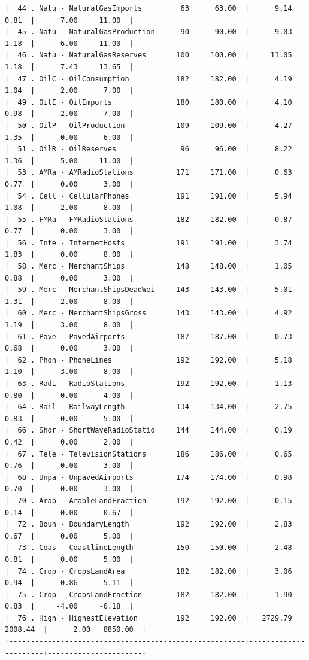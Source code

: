 \documentclass[a4paper,10pt,twocolumn]{article}
\begin{document}
\begin{landscape}
\begin{verbatim}
|  44 . Natu - NaturalGasImports         63      63.00  |      9.14      0.81  |      7.00     11.00  |
|  45 . Natu - NaturalGasProduction      90      90.00  |      9.03      1.18  |      6.00     11.00  |
|  46 . Natu - NaturalGasReserves       100     100.00  |     11.05      1.18  |      7.43     13.65  |
|  47 . OilC - OilConsumption           182     182.00  |      4.19      1.04  |      2.00      7.00  |
|  49 . OilI - OilImports               180     180.00  |      4.10      0.98  |      2.00      7.00  |
|  50 . OilP - OilProduction            109     109.00  |      4.27      1.35  |      0.00      6.00  |
|  51 . OilR - OilReserves               96      96.00  |      8.22      1.36  |      5.00     11.00  |
|  53 . AMRa - AMRadioStations          171     171.00  |      0.63      0.77  |      0.00      3.00  |
|  54 . Cell - CellularPhones           191     191.00  |      5.94      1.08  |      2.00      8.00  |
|  55 . FMRa - FMRadioStations          182     182.00  |      0.87      0.77  |      0.00      3.00  |
|  56 . Inte - InternetHosts            191     191.00  |      3.74      1.83  |      0.00      8.00  |
|  58 . Merc - MerchantShips            148     148.00  |      1.05      0.88  |      0.00      3.00  |
|  59 . Merc - MerchantShipsDeadWei     143     143.00  |      5.01      1.31  |      2.00      8.00  |
|  60 . Merc - MerchantShipsGross       143     143.00  |      4.92      1.19  |      3.00      8.00  |
|  61 . Pave - PavedAirports            187     187.00  |      0.73      0.68  |      0.00      3.00  |
|  62 . Phon - PhoneLines               192     192.00  |      5.18      1.10  |      3.00      8.00  |
|  63 . Radi - RadioStations            192     192.00  |      1.13      0.80  |      0.00      4.00  |
|  64 . Rail - RailwayLength            134     134.00  |      2.75      0.83  |      0.00      5.00  |
|  66 . Shor - ShortWaveRadioStatio     144     144.00  |      0.19      0.42  |      0.00      2.00  |
|  67 . Tele - TelevisionStations       186     186.00  |      0.65      0.76  |      0.00      3.00  |
|  68 . Unpa - UnpavedAirports          174     174.00  |      0.98      0.70  |      0.00      3.00  |
|  70 . Arab - ArableLandFraction       192     192.00  |      0.15      0.14  |      0.00      0.67  |
|  72 . Boun - BoundaryLength           192     192.00  |      2.83      0.67  |      0.00      5.00  |
|  73 . Coas - CoastlineLength          150     150.00  |      2.48      0.81  |      0.00      5.00  |
|  74 . Crop - CropsLandArea            182     182.00  |      3.06      0.94  |      0.86      5.11  |
|  75 . Crop - CropsLandFraction        182     182.00  |     -1.90      0.83  |     -4.00     -0.18  |
|  76 . High - HighestElevation         192     192.00  |   2729.79   2008.44  |      2.00   8850.00  |
+-------------------------------------------------------+----------------------+----------------------+


\end{verbatim}
\end{landscape}
\end{document}
